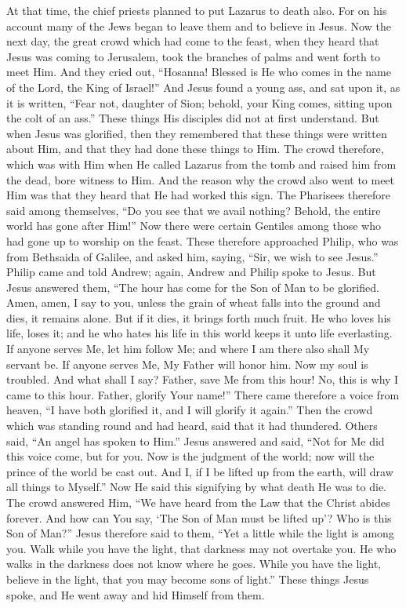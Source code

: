 {{    At that time, the chief priests planned to put Lazarus to death also. For on
    his  account many of the Jews began to leave them and to believe in
    Jesus. Now the next day, the great crowd which had come to the feast, when
    they heard that Jesus was coming to Jerusalem, took the branches of palms
    and went forth to meet Him. And they cried out, ``Hosanna! Blessed is He
    who comes in the name of the Lord, the King of Israel!'' And Jesus found a
    young ass, and sat upon it, as it is written, ``Fear not, daughter of Sion;
    behold, your King comes, sitting upon the colt of an ass.'' These things His
    disciples did not at first understand. But when Jesus was glorified, then
    they remembered that these things were written about Him, and that they had
    done these things to Him.  The crowd therefore, which was with Him when He
    called Lazarus from the tomb and raised him from the dead, bore witness to
    Him. And the reason why the crowd also went to meet Him was that they
    heard that He had worked this sign. The Pharisees therefore said among
    themselves, ``Do you see that we avail nothing?  Behold, the entire world has
    gone after Him!'' Now there were certain Gentiles among those who had gone
    up to worship on the feast. These therefore approached Philip, who was from
    Bethsaida of Galilee, and asked him, saying, ``Sir, we wish to see Jesus.''
    Philip came and told Andrew; again, Andrew and Philip spoke to Jesus. But
    Jesus answered them, ``The hour has come for the Son of Man to be
    glorified. Amen, amen, I say to you, unless the grain of wheat falls into
    the ground and dies, it remains alone. But if it dies, it brings forth much
    fruit. He who loves his life, loses it; and he who hates his life in this
    world keeps it unto life everlasting.  If anyone serves Me, let him follow
    Me; and where I am there also shall My servant be. If anyone serves Me, My
    Father will honor him. Now my soul is troubled.  And what shall I say?
    Father, save Me from this hour! No, this is why I came to this
    hour. Father, glorify Your name!'' There came therefore a voice from heaven,
    ``I have both glorified it, and I will glorify it again.''  Then the crowd
    which was standing round and had heard, said that it had thundered. Others
    said, ``An angel has spoken to Him.'' Jesus answered and said, ``Not for Me
    did this voice come, but for you. Now is the judgment of the world; now
    will the prince of the world be cast out. And I, if I be lifted up from the
    earth, will draw all things to Myself.'' Now He said this signifying by what
    death He was to die. The crowd answered Him, ``We have heard from the Law
    that the Christ abides forever. And how can You say, `The Son of Man must be
    lifted up'? Who is this Son of Man?''  Jesus therefore said to them, ``Yet a
    little while the light is among you. Walk while you have the light, that
    darkness may not overtake you. He who walks in the darkness does not know
    where he goes. While you have the light, believe in the light, that you may
    become sons of light.'' These things Jesus spoke, and He went away and hid
    Himself from them.

  }
}
